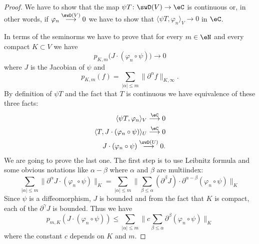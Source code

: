 \begin{proof}
    We have to show that the map \( \psi T\colon \swD(V)\to \eC\) is continuous or, in other words, if \( \varphi_n\stackrel{\swD(V)}{\longrightarrow}0\) we have to show that \( \langle \psi T, \varphi_n\rangle_V\to 0\) in \( \eC\).

    In terms of the seminorms we have to prove that for every \( m\in \eN\) and every compact \( K\subset V\) we have
    \begin{equation}
        p_{K,m}\big( J\cdot(\varphi_n\circ \psi) \big)\to 0
    \end{equation}
    where \( J\) is the Jacobian of \( \psi\) and
    \begin{equation}
        p_{K,m}(f)=\sum_{| \alpha |\leq m}\| \partial^{\alpha}f \|_{K,\infty}.
    \end{equation}
    By definition of \( \psi T\) and the fact that \( T\) is continuous we have equivalence of these three facts:
    \begin{subequations}
        \begin{align}
            \langle \psi T, \varphi_n\rangle_V\stackrel{\eC}{\longrightarrow}0\\
            \langle  T, J\cdot (\varphi_n\circ \psi)  \rangle_U\stackrel{\eC}{\longrightarrow}0\\
            J\cdot(\varphi_n\circ\psi)\stackrel{\swD(U)}{\longrightarrow}0.
        \end{align}
    \end{subequations}
    We are going to prove the last one. The first step is to use Leibnitz formula and some obvious notations like \( \alpha-\beta\) where \( \alpha\) and \( \beta\) are multiindex:
    \begin{equation}
        \sum_{| \alpha |\leq m}\| \partial^{\alpha}J\cdot(\varphi_n\circ\psi) \|_{K}=\sum_{| \alpha |\leq m}\| \sum_{\beta\leq \alpha}(\partial^{\beta}J)\cdot \partial^{\alpha-\beta}(\varphi_n\circ\psi) \|_K
    \end{equation}
    Since \( \psi\) is a diffeomorphism, \( J\) is bounded and from the fact that \( K\) is compact, each of the \( \partial^{\gamma}J\) is bounded. Thus we have
    \begin{equation}
        p_{m,K}(J\cdot (\varphi_n\circ \psi))\leq \sum_{| \alpha |\leq m}\|c \sum_{\beta\leq \alpha} \partial^{\beta}(\varphi_n\circ\psi) \|_{K}
    \end{equation}
    where the constant \( c\) depends on \( K\) and \( m\).


\end{proof}
